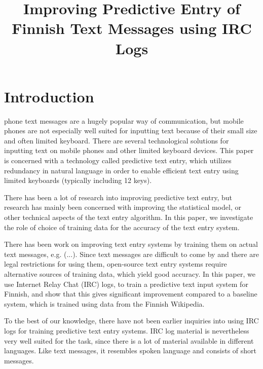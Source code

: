 \documentclass[a4paper,conference]{IEEEtran}
\title{Improving Predictive Entry of Finnish Text Messages using IRC Logs}
\author{
\IEEEauthorblockA{\ldots\\
\ldots\\
\ldots\\
\ldots}
\and
\IEEEauthorblockA{\ldots\\
\ldots\\
\ldots\\
\ldots}
\and
\IEEEauthorblockA{\ldots\\
\ldots\\
\ldots\\
\ldots}
}
\begin{document}
\maketitle


\begin{abstract}

\end{abstract}

\section{Introduction}
\label{sec:introduction}

 phone text messages are a hugely popular way
of communication, but mobile phones are not especially well suited for
inputting text because of their small size and often limited
keyboard. There are several technological solutions for inputting text
on mobile phones and other limited keyboard devices. This paper is
concerned with a technology called predictive text entry, which utilizes
redundancy in natural language in order to enable efficient text entry
using limited keyboards (typically including 12 keys).

There has been a lot of research into improving predictive text entry,
but research has mainly been concerned with improving the statistical
model, or other technical aspects of the text entry algorithm. In this
paper, we investigate the role of choice of training data for the
accuracy of the text entry system.

There has been work on improving text entry systems by training them
on actual text messages, e.g. (...). Since text messages are difficult
to come by and there are legal restrictions for using them,
open-source text entry systems require alternative sources of training
data, which yield good accuracy. In this paper, we use Internet Relay
Chat (IRC) logs, to train a predictive text input system for Finnish,
and show that this gives significant improvement compared to a
baseline system, which is trained using data from the Finnish
Wikipedia. 

To the best of our knowledge, there have not been earlier inquiries
into using IRC logs for training predictive text entry systems. IRC
log material is nevertheless very well suited for the task, since
there is a lot of material available in different languages. Like text
messages, it resembles spoken language and consists of short messages.
\end{document}
